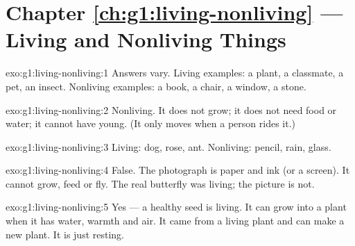 \section*{Chapter \ref{ch:g1:living-nonliving} --- Living and Nonliving Things}

\begin{solution}{exo:g1:living-nonliving:1}
Answers vary. Living examples: a plant, a classmate, a pet, an
insect. Nonliving examples: a book, a chair, a window, a stone.
\end{solution}

\begin{solution}{exo:g1:living-nonliving:2}
Nonliving. It does not grow; it does not need food or water; it
cannot have young. (It only moves when a person rides it.)
\end{solution}

\begin{solution}{exo:g1:living-nonliving:3}
Living: dog, rose, ant. Nonliving: pencil, rain, glass.
\end{solution}

\begin{solution}{exo:g1:living-nonliving:4}
False. The photograph is paper and ink (or a screen). It cannot
grow, feed or fly. The real butterfly was living; the picture is
not.
\end{solution}

\begin{solution}{exo:g1:living-nonliving:5}
Yes --- a healthy seed is living. It can grow into a plant when it
has water, warmth and air. It came from a living plant and can make
a new plant. It is just resting.
\end{solution}

